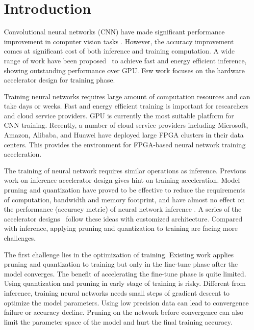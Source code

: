 \section{Introduction}\label{sec:introduction}

Convolutional neural networks (CNN) have made significant performance improvement in computer vision tasks \cite{He2016Deep, Shelhamer2017Fully}. However, the accuracy improvement comes at significant cost of both inference and training computation. A wide range of work have been proposed~\cite{qiu2016going, han2017ese} to achieve fast and energy efficient inference, showing outstanding performance over GPU. Few work focuses on the hardware accelerator design for training phase. 

Training neural networks requires large amount of computation resources and can take days or weeks. Fast and energy efficient training is important for researchers and cloud service providers. GPU is currently the most suitable platform for CNN training. Recently, a number of cloud service providers including Microsoft, Amazon, Alibaba, and Huawei have deployed large FPGA clusters in their data centers. This provides the environment for FPGA-based neural network training acceleration.

The training of neural network requires similar operations as inference. Previous work on inference accelerator design gives hint on training acceleration. Model pruning and quantization have proved to be effective to reduce the requirements of computation, bandwidth and memory footprint, and have almost no effect on the performance (accuracy metric) of neural network inference \cite{han2015deep}. A series of the accelerator designs~\cite{qiu2016going, han2017ese} follow these ideas with customized architecture. Compared with inference, applying pruning and quantization to training are facing more challenges.

The first challenge lies in the optimization of training. Existing work \cite{han2015deep} applies pruning and quantization to training but only in the fine-tune phase after the model converges. The benefit of accelerating the fine-tune phase is quite limited. Using quantization and pruning in early stage of training is risky. Different from inference, training neural networks needs small steps of gradient descent to optimize the model parameters. Using low precision data can lead to convergence failure or accuracy decline. Pruning on the network before convergence can also limit the parameter space of the model and hurt the final training accuracy. 


